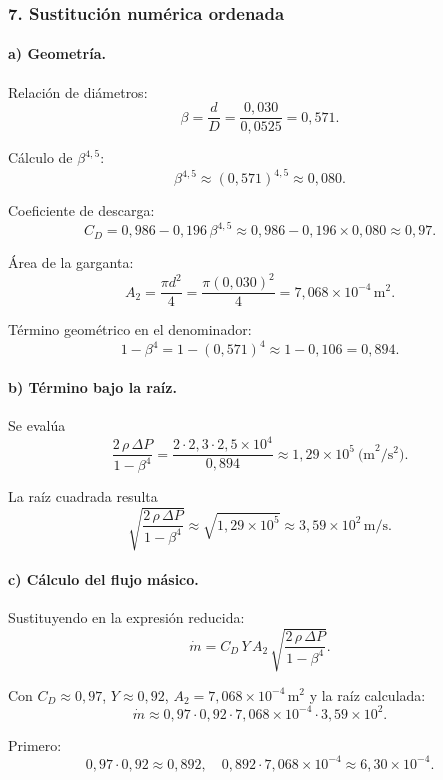 \documentclass[12pt, a4paper]{article}
\begin{document}
\subsubsection*{7. Sustitución numérica ordenada}

\paragraph{a) Geometría.}

Relación de diámetros:
\[
\beta = \frac{d}{D} 
      = \frac{0{,}030}{0{,}0525}
      = 0{,}571.
\]

Cálculo de $\beta^{4{,}5}$:
\[
\beta^{4{,}5} \approx (0{,}571)^{4{,}5} \approx 0{,}080.
\]

Coeficiente de descarga:
\[
C_D = 0{,}986 - 0{,}196\,\beta^{4{,}5}
    \approx 0{,}986 - 0{,}196\times 0{,}080
    \approx 0{,}97.
\]

Área de la garganta:
\[
A_2 = \frac{\pi d^2}{4}
    = \frac{\pi(0{,}030)^2}{4}
    = 7{,}068\times 10^{-4}\,\text{m}^2.
\]

Término geométrico en el denominador:
\[
1-\beta^4 = 1 - (0{,}571)^4
          \approx 1 - 0{,}106
          = 0{,}894.
\]

\paragraph{b) Término bajo la raíz.}

Se evalúa
\[
\frac{2\,\rho\,\Delta P}{1-\beta^4}
= \frac{2\cdot 2{,}3\cdot 2{,}5\times 10^4}{0{,}894}
\approx 1{,}29\times 10^5\ \text{(m}^2/\text{s}^2).
\]

La raíz cuadrada resulta
\[
\sqrt{\frac{2\,\rho\,\Delta P}{1-\beta^4}}
\approx \sqrt{1{,}29\times 10^5}
\approx 3{,}59\times 10^2\,\text{m/s}.
\]

\paragraph{c) Cálculo del flujo másico.}

Sustituyendo en la expresión reducida:
\[
\dot m 
= C_D\,Y\,A_2\,
  \sqrt{\frac{2\,\rho\,\Delta P}{1-\beta^4}}.
\]

Con $C_D \approx 0{,}97$, $Y \approx 0{,}92$, 
$A_2 = 7{,}068\times 10^{-4}\,\text{m}^2$ y la raíz calculada:
\[
\dot m 
\approx 0{,}97\cdot 0{,}92\cdot 7{,}068\times 10^{-4}
       \cdot 3{,}59\times 10^2.
\]

Primero:
\[
0{,}97\cdot 0{,}92 \approx 0{,}892,
\quad
0{,}892\cdot 7{,}068\times 10^{-4}
\approx 6{,}30\times 10^{-4}.
\]
\end{document}
